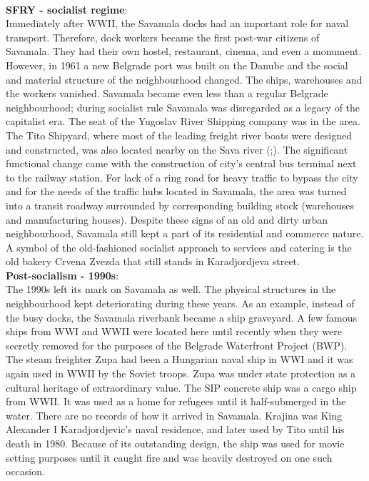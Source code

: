 \documentclass[11pt]{report}
\begin{document}
\\
\textbf{SFRY - socialist regime}:
\\
Immediately  after  WWII,  the Savamala  docks  had an  important  role  for  naval  transport.  Therefore, dock workers became the first post-war citizens of Savamala.  They had their own hostel, restaurant,  cinema,  and  even  a  monument.  However,  in  1961  a  new  Belgrade  port was built on the Danube and the social and material structure of the neighbourhood changed. The ships, warehouses and the workers vanished.  Savamala became even less than a regular  Belgrade  neighbourhood;  during   socialist  rule  Savamala  was  disregarded  as  a  legacy of the capitalist era.
The seat of the Yugoslav River Shipping company was in the area. The Tito Shipyard, where most of the leading freight river boats were designed and constructed, was also located nearby on the Sava river (\href{Markovic}{\citealt{markovic_wide_2013}};\href{Markovic}{\citealt{Kamenzind2 media}}). 
The significant functional change came with the construction of city’s central bus terminal next to the railway station. For lack of a ring road for heavy traffic to bypass the city and for the needs of the traffic hubs located in Savamala, the area was turned into a transit roadway  surrounded  by  corresponding building stock (warehouses and manufacturing houses). Despite  these  signs  of  an  old  and  dirty urban  neighbourhood,  Savamala  still  kept  a  part  of  its  residential  and  commerce  nature. A symbol of the old-fashioned socialist approach to services and catering is the old bakery Crvena Zvezda that still stands in Karadjordjeva street.
\\
\textbf{Post-socialism - 1990s}:
\\
The 1990s left its mark on Savamala as well. The physical structures in the neighbourhood kept deteriorating during these years. As an example, instead of the busy docks, the Savamala riverbank became a ship graveyard. A few famous ships from WWI and WWII were located here until recently when they were secretly removed for the purposes of the Belgrade Waterfront Project  (BWP).
\\

The steam freighter Zupa had been a Hungarian naval ship in WWI and it was again used in WWII by the Soviet troops. Zupa was under state protection as a cultural heritage of extraordinary value. The SIP concrete ship was a cargo ship from WWII. It was used as a home for refugees until it half-submerged in the water. There are no records of how it arrived in Savamala. Krajina was King Alexander I Karadjordjevic’s naval residence, and later used by Tito until his death in 1980. Because of its outstanding design, the ship was used for movie setting purposes until it caught fire and was heavily destroyed on one such occasion.
\\
\end{document}
